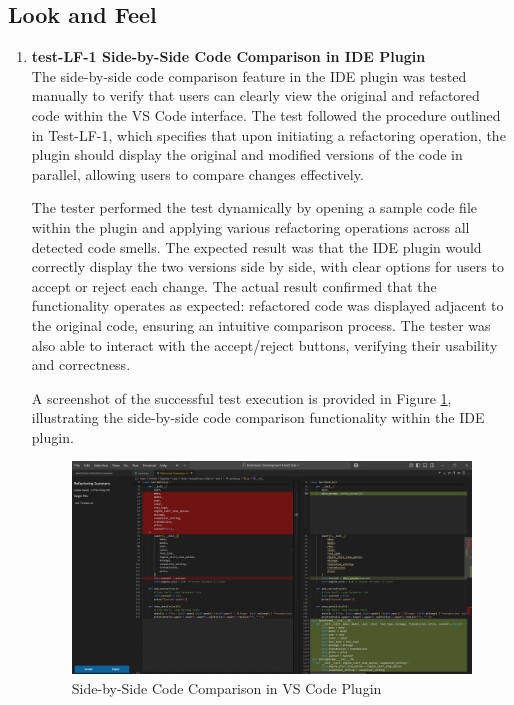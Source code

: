\documentclass[12pt, titlepage]{article}
\begin{document}
\subsection{Look and Feel}
\begin{enumerate}
  \item \textbf{test-LF-1 Side-by-Side Code Comparison in IDE Plugin} \\[2mm]
    The side-by-side code comparison feature in the IDE plugin was
    tested manually to verify that users can clearly view the
    original and refactored code within the VS Code interface. The
    test followed the procedure outlined in Test-LF-1, which
    specifies that upon initiating a refactoring operation, the
    plugin should display the original and modified versions of the
    code in parallel, allowing users to compare changes effectively.

    The tester performed the test dynamically by opening a sample
    code file within the plugin and applying various refactoring
    operations across all detected code smells. The expected result
    was that the IDE plugin would correctly display the two versions
    side by side, with clear options for users to accept or reject
    each change. The actual result confirmed that the functionality
    operates as expected: refactored code was displayed adjacent to
    the original code, ensuring an intuitive comparison process. The
    tester was also able to interact with the accept/reject buttons,
    verifying their usability and correctness.

    A screenshot of the successful test execution is provided in
    Figure \ref{fig:lf1_test}, illustrating the side-by-side code
    comparison functionality within the IDE plugin.

    \FloatBarrier
    \begin{figure}[h]
      \centering
      \includegraphics[width=0.8\linewidth]{../Images/test-LF-1-image.png}
      \caption{Side-by-Side Code Comparison in VS Code Plugin}
      \label{fig:lf1_test}
    \end{figure}
    \FloatBarrier


\end{enumerate}
\end{document}
